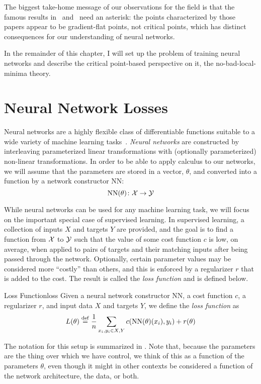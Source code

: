 \documentclass[../../thesis.tex]{subfiles}
\begin{document}
The biggest take-home message of our observations for the field
is that the famous results
in~\cite{dauphin2014} and~\cite{pennington2017}
need an asterisk:
the points characterized by those papers appear to be
gradient-flat points, not critical points,
which has distinct consequences for our understanding of neural networks.

In the remainder of this chapter,
I will set up the problem of training neural networks
and describe the critical point-based perspective on it,
the no-bad-local-minima theory.

\section{Neural Network Losses}

Neural networks are a highly flexible class of
differentiable functions
suitable to a wide variety of
machine learning tasks~\cite{lecun2015}.
\emph{Neural networks} are constructed by interleaving
parameterized linear transformations
with (optionally parameterized) non-linear transformations.
In order to be able to apply calculus
to our networks, we will assume that
the parameters are stored in a vector, $\theta$,
and converted into a function by a network constructor
$\mathrm{NN}$:
\begin{equation}
	\mathrm{NN}(\theta) \colon {\mathcal{X}} \to {\mathcal{Y}}
\end{equation}

While neural networks can be used for any machine learning task,
we will focus on the important special case of supervised learning.
In supervised learning, a collection of inputs $X$ and targets $Y$
are provided, and the goal is to find a function from ${\mathcal{X}}$ to ${\mathcal{Y}}$
such that the value of some cost function $c$ is low, on average, when applied to
pairs of targets and their matching inputs after being passed through the network.
Optionally, certain parameter values may be considered more \enquote{costly}
than others, and this is enforced by a regularizer $r$
that is added to the cost.
The result is called the \emph{loss function}
and is defined below.
\begin{definition}{Loss Function}{loss}
	Given a neural network constructor $\mathrm{NN}$,
	a cost function $c$,
	a regularizer $r$,
	and input data $X$ and targets $Y$,
	we define the \emph{loss function} as
	\begin{equation}\equationlabel{def-loss}
		L(\theta) \defeq \frac{1}{n}\sum_{x_i, y_i \in X, Y} c(\mathrm{NN}(\theta)(x_i), y_i) + r(\theta)
	\end{equation}
\end{definition}
The notation for this setup is summarized in .
Note that,
because the parameters are the thing over which we have control,
we think of this as a function of the parameters $\theta$,
even though it might in other contexts be considered
a function of the network architecture, the data, or both.
\end{document}
